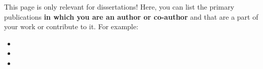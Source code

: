 
This page is only relevant for dissertations! Here, you can list the primary publications \textbf{in which you are an author or co-author} and that are a part of your work or contribute to it. For example:

\begin{itemize}
	\item {}
	\item {}
	\item {}
\end{itemize}

